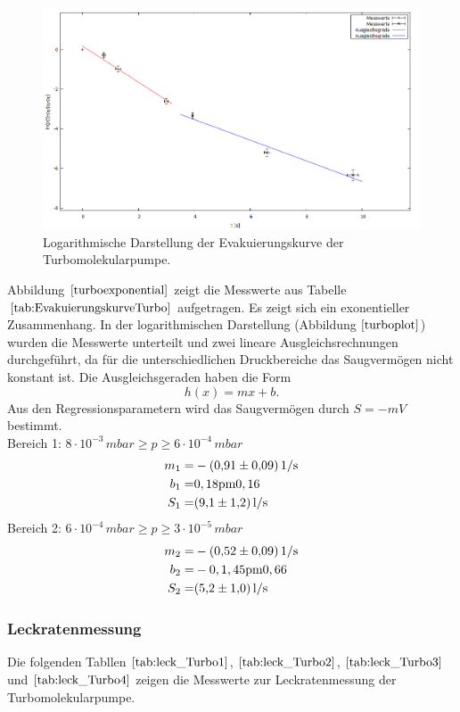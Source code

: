 \begin{figure}[H]
  \centering
  \includegraphics[width=14cm]{bilder/turbodruck plot.png}
  \caption{Logarithmische Darstellung der Evakuierungskurve der Turbomolekularpumpe.}
  \label{turboplot}
\end{figure}
Abbildung $\ref{turboexponential}$ zeigt die Messwerte aus Tabelle $\ref{tab:EvakuierungskurveTurbo}$ aufgetragen.
Es zeigt sich ein exonentieller Zusammenhang.
In der logarithmischen Darstellung (Abbildung $\ref{turboplot}$) wurden die Messwerte unterteilt und zwei lineare Ausgleichsrechnungen durchgeführt, da für die unterschiedlichen Druckbereiche das Saugvermögen nicht konstant ist.
Die Ausgleichsgeraden haben die Form
\begin{equation}
 h(x)=mx+b.
\end{equation}
Aus den Regressionsparametern wird das Saugvermögen durch $S=-mV$ bestimmt.\\

Bereich 1: $8 \cdot 10^{-3} \, \si{mbar} \geq p \geq 6 \cdot 10^{-4} \, \si{mbar}$\\
\begin{align*}
	m_1=& -\SI{0,91 \pm 0,09}{1/s}\\
	b_1=& \si{0,18 \pm 0,16}\\
	S_1=& \SI{9,1 \pm 1,2}{l/s}
\end{align*}
Bereich 2: $6 \cdot 10^{-4} \, \si{mbar} \geq p \geq 3 \cdot 10^{-5} \, \si{mbar}$\\
\begin{align*}
	m_2=& -\SI{0,52 \pm 0,09}{1/s}\\
	b_2=& -\si{0,1,45 \pm 0,66}\\
	S_2=& \SI{5,2 \pm 1,0}{l/s}
\end{align*}

\subsubsection{Leckratenmessung}
Die folgenden Tabllen $\ref{tab:leck_Turbo1}$, $\ref{tab:leck_Turbo2}$, $\ref{tab:leck_Turbo3}$ und $\ref{tab:leck_Turbo4}$ zeigen die Messwerte zur Leckratenmessung der Turbomolekularpumpe.

